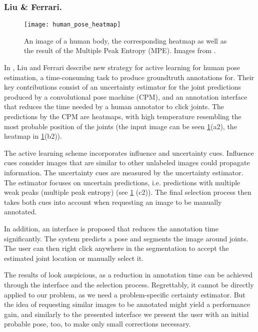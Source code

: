 \subsubsection{Liu \& Ferrari.}

\begin{figure}[!tbp]
	\centering
    \texttt{[image: human\_pose\_heatmap]}
    \caption{An image of a human body, the corresponding heatmap as well as the result of the Multiple Peak Entropy (MPE). Images from \cite{humanpose}.}
    \label{fig:humanpose}
\end{figure}
In \cite{humanpose}, Liu and Ferrari describe new strategy for active learning for human pose estimation, a time-consuming task to produce groundtruth annotations for. Their key contributions consist of an uncertainty estimator for the joint predictions produced by a convolutional pose machine (CPM), and an annotation interface that reduces the time needed by a human annotator to click joints. The predictions by the CPM are heatmaps, with high temperature resembling the most probable position of the joints (the input image can be seen \fig \ref{fig:humanpose}(a2), the heatmap in \ref{fig:humanpose}(b2)).

The active learning scheme incorporates influence and uncertainty cues. Influence cues consider images that are similar to other unlabeled images could propagate information. The uncertainty cues are measured by the uncertainty estimator. The estimator focuses on uncertain predictions, i.e. predictions with multiple weak peaks (multiple peak entropy) (see \fig \ref{fig:humanpose} (c2)). The final selection process then takes both cues into account when requesting an image to be manually annotated.

In addition, an interface is proposed that reduces the annotation time significantly. The system predicts a pose and segments the image around joints. The user can then right click anywhere in the segmentation to accept the estimated joint location or manually select it.

The results of \cite{humanpose} look auspicious, as a reduction in annotation time can be achieved through the interface and the selection process. Regrettably, it cannot be directly applied to our problem, as we need a problem-specific certainty estimator. But the idea of requesting similar images to be annotated might yield a performance gain, and similarly to the presented interface we present the user with an initial probable pose, too, to make only small corrections necessary.